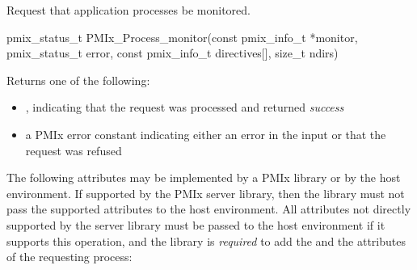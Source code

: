 \summary

Request that application processes be monitored.

\format

\cspecificstart
\begin{codepar}
pmix_status_t
PMIx_Process_monitor(const pmix_info_t *monitor, pmix_status_t error,
                     const pmix_info_t directives[], size_t ndirs)
\end{codepar}
\cspecificend

\begin{arglist}
\end{arglist}

Returns one of the following:

\begin{itemize}
    \item {}, indicating that the request was processed and returned \textit{success}
    \item a PMIx error constant indicating either an error in the input or that the request was refused
\end{itemize}

\optattrstart
The following attributes may be implemented by a \ac{PMIx} library or by the host environment. If supported by the \ac{PMIx} server library, then the library must not pass the supported attributes to the host environment. All attributes not directly supported by the server library must be passed to the host environment if it supports this operation, and the library is \textit{required} to add the  and the  attributes of the requesting process:


